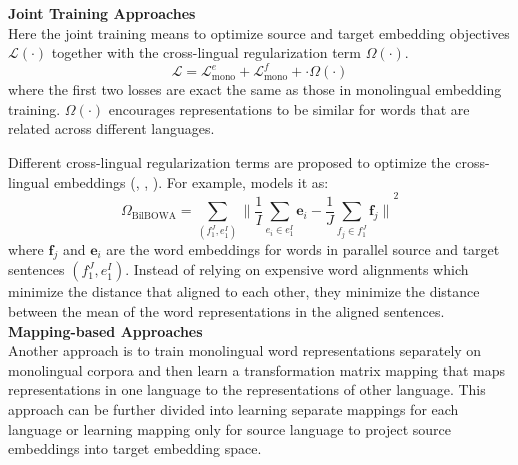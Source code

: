 \textbf{Joint Training Approaches}\\
Here the joint training means to optimize source and target embedding objectives $\mathcal{L(\cdot)}$ together with the cross-lingual regularization term $\Omega(\cdot)$. 
\[ \mathcal{L} =  \mathcal{L}_{\text{mono}}^e + \mathcal{L}_{\text{mono}}^f + \cdot \Omega(\cdot)  \]
where the first two losses are exact the same as those in monolingual embedding training.  $\Omega(\cdot)$  encourages representations to be similar for words that are related across different languages.

Different cross-lingual regularization terms are proposed to optimize the cross-lingual embeddings (\cite{coulmance2016trans}, \cite{luong2015bilingual}, \cite{gouws2015bilbowa}). For example, \cite{gouws2015bilbowa} models it as: 
\[ \Omega_{\text{BilBOWA}} = \sum_{( f_1^J, e_1^I)}{\lVert \frac{1}{I}  \sum_{e_i \in e_1^I} \bm{e}_i - \frac{1}{J} \sum_{f_j \in f_1^J} \bm{f}_j\rVert}^2 \]
where $\bm{f}_j$ and $\bm{e}_i$ are the word embeddings for words in parallel source and target sentences $(f_1^J, e_1^I)$. Instead of relying on expensive word alignments which minimize the distance that aligned to each other, they minimize the distance between the mean of the word representations in the aligned sentences. \\

\textbf{Mapping-based Approaches}\\
Another approach is to train monolingual word representations separately on monolingual corpora and then learn a transformation matrix mapping that maps representations in one language to the representations of other language.  This approach can be further divided into learning separate mappings for each language or learning mapping only for source language to project source embeddings into target embedding space.


